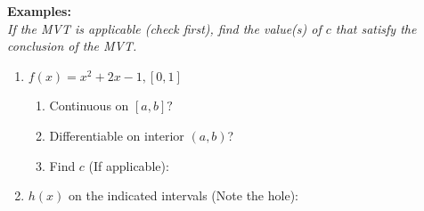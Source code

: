\documentclass[12pt]{report}
\begin{document}
\textbf{Examples:} \\

\textit{If the MVT is applicable (check first), find the value(s) of $c$ that satisfy the conclusion of the MVT.}  \\

\begin{enumerate}

\item $f(x) = x^2 + 2x -1, [0,1]$ \\

	\begin{enumerate}
	
	\item Continuous on $[a,b]?$
	
	\vspace{0.5 in}
	
	\item Differentiable on interior $(a,b)$? 
	
	\vspace{0.5 in}
	
	\item Find $c$ (If applicable): 
	
	\vspace{1 in}
	
	\end{enumerate}
	

\item $h(x)$ on the indicated intervals (Note the hole):

\begin{multicols}{2}


\end{multicols}
\end{enumerate}
\end{document}
